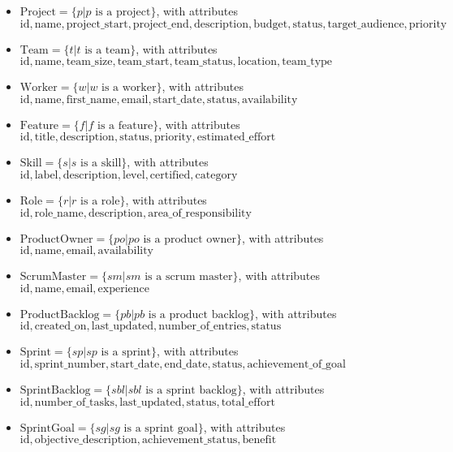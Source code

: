 \documentclass[11pt]{article}
\begin{document}
\begin{itemize}
    \item $\text{Project} = \{p | p \text{ is a project}\}$, with attributes $\text{id}, \text{name}, \text{project\_start}, \text{project\_end}, \text{description}, \text{budget}, \text{status}, \text{target\_audience}, \text{priority}$
    \item $\text{Team} = \{t | t \text{ is a team}\}$, with attributes $\text{id}, \text{name}, \text{team\_size}, \text{team\_start}, \text{team\_status}, \text{location}, \text{team\_type}$
    \item $\text{Worker} = \{w | w \text{ is a worker}\}$, with attributes $\text{id}, \text{name}, \text{first\_name}, \text{email}, \text{start\_date}, \text{status}, \text{availability}$
    \item $\text{Feature} = \{f | f \text{ is a feature}\}$, with attributes $\text{id}, \text{title}, \text{description}, \text{status}, \text{priority}, \text{estimated\_effort}$
    \item $\text{Skill} = \{s | s \text{ is a skill}\}$, with attributes $\text{id}, \text{label}, \text{description}, \text{level}, \text{certified}, \text{category}$
    \item $\text{Role} = \{r | r \text{ is a role}\}$, with attributes $\text{id}, \text{role\_name}, \text{description}, \text{area\_of\_responsibility}$
    \item $\text{ProductOwner} = \{po | po \text{ is a product owner}\}$, with attributes $\text{id}, \text{name}, \text{email}, \text{availability}$
    \item $\text{ScrumMaster} = \{sm | sm \text{ is a scrum master}\}$, with attributes $\text{id}, \text{name}, \text{email}, \text{experience}$
    \item $\text{ProductBacklog} = \{pb | pb \text{ is a product backlog}\}$, with attributes $\text{id}, \text{created\_on}, \text{last\_updated}, \text{number\_of\_entries}, \text{status}$
    \item $\text{Sprint} = \{sp | sp \text{ is a sprint}\}$, with attributes $\text{id}, \text{sprint\_number}, \text{start\_date}, \text{end\_date}, \text{status}, \text{achievement\_of\_goal}$
    \item $\text{SprintBacklog} = \{sbl | sbl \text{ is a sprint backlog}\}$, with attributes $\text{id}, \text{number\_of\_tasks}, \text{last\_updated}, \text{status}, \text{total\_effort}$
    \item $\text{SprintGoal} = \{sg | sg \text{ is a sprint goal}\}$, with attributes $\text{id}, \text{objective\_description}, \text{achievement\_status}, \text{benefit}$

\end{itemize}
\end{document}
